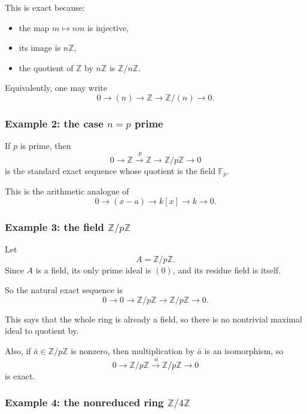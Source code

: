 \documentclass[12pt,a4paper]{article}
\theoremstyle{notespace}
\theoremstyle{definition}
\begin{document}
This is exact because:

\begin{itemize}
	\item the map \(m\mapsto nm\) is injective,
	\item its image is \(n\mathbb Z\),
	\item the quotient of \(\mathbb Z\) by \(n\mathbb Z\) is \(\mathbb Z/n\mathbb Z\).
\end{itemize}

Equivalently, one may write
\[
0 \longrightarrow (n) \longrightarrow \mathbb Z \longrightarrow \mathbb Z/(n) \longrightarrow 0.
\]

\subsubsection{Example 2: the case \(n=p\) prime}

If \(p\) is prime, then
\[
0 \longrightarrow \mathbb Z \xrightarrow{\cdot p} \mathbb Z \longrightarrow \mathbb Z/p\mathbb Z \longrightarrow 0
\]
is the standard exact sequence whose quotient is the field \(\mathbb F_p\).

This is the arithmetic analogue of
\[
0 \longrightarrow (x-a) \longrightarrow k[x] \longrightarrow k \longrightarrow 0.
\]

\subsubsection{Example 3: the field \(\mathbb Z/p\mathbb Z\)}

Let
\[
A=\mathbb Z/p\mathbb Z.
\]
Since \(A\) is a field, its only prime ideal is \((0)\), and its residue field is itself.

So the natural exact sequence is
\[
0 \longrightarrow 0 \longrightarrow \mathbb Z/p\mathbb Z \longrightarrow \mathbb Z/p\mathbb Z \longrightarrow 0.
\]

This says that the whole ring is already a field, so there is no nontrivial maximal ideal to quotient by.

Also, if \(\bar a\in \mathbb Z/p\mathbb Z\) is nonzero, then multiplication by \(\bar a\) is an isomorphism, so
\[
0 \longrightarrow \mathbb Z/p\mathbb Z
\xrightarrow{\cdot \bar a}
\mathbb Z/p\mathbb Z
\longrightarrow 0
\]
is exact.

\subsubsection{Example 4: the nonreduced ring \(\mathbb Z/4\mathbb Z\)}
\end{document}
